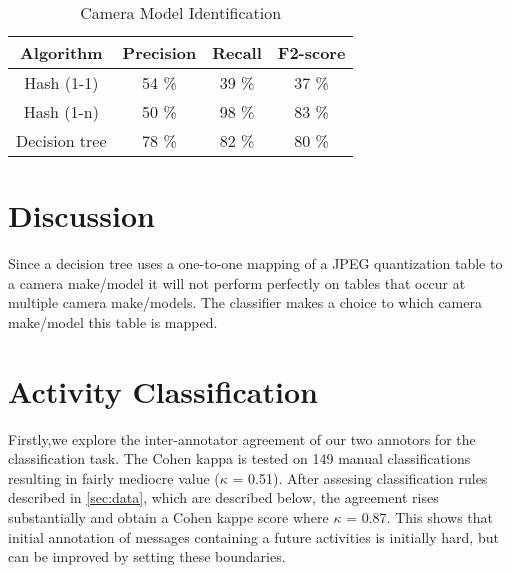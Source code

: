 \begin{table}

\begin{tabular}{| c| c| c| c|}
\hline
Algorithm & Precision & Recall & F2-score\\
\hline
Hash (1-1) & 54 \% & 39 \% & 37 \%\\
Hash (1-n) & 50 \% & 98 \% & 83 \%\\
Decision tree & 78 \% & 82 \% & 80 \% \\
\hline
\end{tabular}
\caption{Camera Model Identification}

\end{table}

\section{Discussion}

Since a decision tree uses a one-to-one mapping of a JPEG quantization table to a camera make/model it will not perform perfectly on tables that occur at multiple camera make/models. The classifier makes a choice to which camera make/model this table is mapped. 



\iffalse
\section{Activity Classification}\label{sec:res_activity}
Firstly,we explore the inter-annotator agreement of our two annotors for the classification task. The Cohen kappa is tested on 149 manual classifications resulting in fairly mediocre value ($\kappa$ = 0.51). After assesing classification rules described in \autoref{sec:data}, which are described below, the agreement rises substantially and obtain a Cohen kappe score where $\kappa$ = 0.87. This shows that initial annotation of messages containing a future activities is initially hard, but can be improved by setting these boundaries.
 
